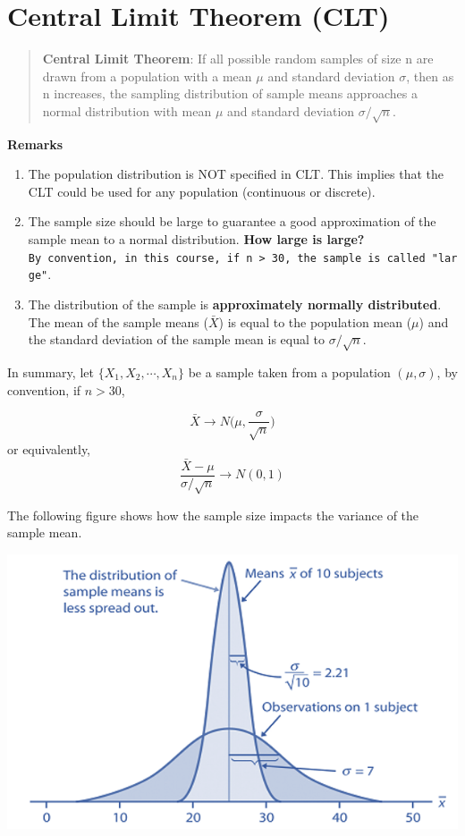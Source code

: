 \documentclass[
]{book}
\begin{document}
\hypertarget{central-limit-theorem-clt}{%
\section{Central Limit Theorem (CLT)}\label{central-limit-theorem-clt}}

\begin{quote}
\textbf{Central Limit Theorem}: If all possible random samples of size n are drawn from a population with a mean \(\mu\) and standard deviation \(\sigma\), then as n increases, the sampling distribution of sample means approaches a normal distribution with mean \(\mu\) and standard deviation \(\sigma/\sqrt{n}\).
\end{quote}

\textbf{Remarks}

\begin{enumerate}
\def\labelenumi{\arabic{enumi}.}
\item
  The population distribution is NOT specified in CLT. This implies that the CLT could be used for any population (continuous or discrete).
\item
  The sample size should be large to guarantee a good approximation of the sample mean to a normal distribution. \textbf{How large is large?} \texttt{By\ convention,\ in\ this\ course,\ if\ n\ \textgreater{}\ 30,\ the\ sample\ is\ called\ "large"}.
\item
  The distribution of the sample is \textbf{approximately normally distributed}. The mean of the sample means (\(\bar{X}\)) is equal to the population mean (\(\mu\)) and the standard deviation of the sample mean is equal to \(\sigma/\sqrt{n}\).
\end{enumerate}

In summary, let \(\{X_1, X_2, \cdots, X_n \}\) be a sample taken from a population \((\mu, \sigma)\), by convention, if \(n > 30\),

\[
\bar{X} \to N \big(\mu, \frac{\sigma}{\sqrt{n}} \big)
\]
or equivalently,
\[
\frac{\bar{X}-\mu}{\sigma/\sqrt{n}} \to N(0, 1)
\]

The following figure shows how the sample size impacts the variance of the sample mean.

\begin{center}\includegraphics[width=0.6\linewidth]{week05/CLT} \end{center}
\end{document}
